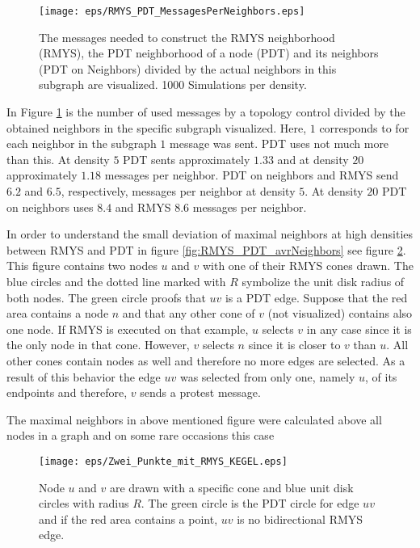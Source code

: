 \begin{figure}[h!]
\centering
\texttt{[image: eps/RMYS\_PDT\_MessagesPerNeighbors.eps]}
\caption{The messages needed to construct the RMYS neighborhood (RMYS), the PDT neighborhood of a node (PDT) and its neighbors (PDT on Neighbors) divided by the actual neighbors in this subgraph are visualized. 1000 Simulations per density.}
\label{fig:RMYS_PDT_MessagesPerNeighbors}
\end{figure}

In Figure \ref{fig:RMYS_PDT_MessagesPerNeighbors} is the number of used messages by a topology control divided by the obtained neighbors in the specific subgraph visualized.
Here, $1 $ corresponds to for each neighbor in the subgraph $1 $ message was sent.
PDT uses not much more than this.
At density $5 $ PDT sents approximately $1.33$ and at density $20 $ approximately $1.18 $ messages per neighbor.
PDT on neighbors and RMYS send $6.2 $ and $6.5 $, respectively, messages per neighbor at density $5 $.
At density $20 $ PDT on neighbors uses $8.4 $ and RMYS $8.6 $ messages per neighbor.


In order to understand the small deviation of maximal neighbors at high densities between RMYS and PDT in figure \ref{fig:RMYS_PDT_avrNeighbors} see figure \ref{fig:RMYS_ErrorBiderectionalEdges}.
This figure contains two nodes $u $ and $v $ with one of their RMYS cones drawn.
The blue circles and the dotted line marked with $R $ symbolize the unit disk radius of both nodes.
The green circle proofs that $uv $ is a PDT edge.
Suppose that the red area contains a node $n $ and that any other cone of $v $ (not visualized) contains also one node.
If RMYS is executed on that example, $u $ selects $v $ in any case since it is the only node in that cone.
However, $v $ selects $n $ since it is closer to $v $ than $u $.
All other cones contain nodes as well and therefore no more edges are selected.
As a result of this behavior the edge $uv $ was selected from only one, namely $u $, of its endpoints and therefore, $v $ sends a protest message.


The maximal neighbors in above mentioned figure were calculated above all nodes in a graph and on some rare occasions this case


\begin{figure}[h!]
\centering
\texttt{[image: eps/Zwei\_Punkte\_mit\_RMYS\_KEGEL.eps]}
\caption{Node $u $ and $v $ are drawn with a specific cone and blue unit disk circles with radius $R $. The green circle is the PDT circle for edge $uv $ and if the red area contains a point, $uv $ is no bidirectional RMYS edge.}
\label{fig:RMYS_ErrorBiderectionalEdges}
\end{figure}



